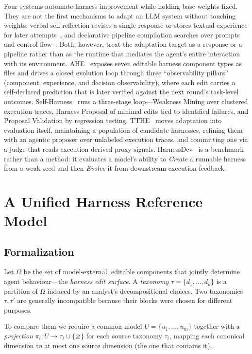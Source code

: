 \documentclass[conference]{IEEEtran}
\begin{document}
Four systems automate harness improvement while holding base weights fixed. They are not the first mechanisms to adapt an LLM system without touching weights: verbal self-reflection revises a single response or stores textual experience for later attempts~\cite{b16}, and declarative pipeline compilation searches over prompts and control flow~\cite{b17}. Both, however, treat the adaptation target as a response or a pipeline rather than as the runtime that mediates the agent's entire interaction with its environment. AHE~\cite{b3} exposes seven editable harness component types as files and drives a closed evolution loop through three ``observability pillars'' (component, experience, and decision observability), where each edit carries a self-declared prediction that is later verified against the next round's task-level outcomes. Self-Harness~\cite{b4} runs a three-stage loop---Weakness Mining over clustered execution traces, Harness Proposal of minimal edits tied to identified failures, and Proposal Validation by regression testing. TTHE~\cite{b5} moves adaptation into evaluation itself, maintaining a population of candidate harnesses, refining them with an agentic proposer over unlabeled execution traces, and committing one via a judge that reads execution-derived proxy signals. HarnessDev~\cite{b6} is a benchmark rather than a method: it evaluates a model's ability to \emph{Create} a runnable harness from a weak seed and then \emph{Evolve} it from downstream execution feedback.

\section{A Unified Harness Reference Model}
\label{sec:uhrm}

\subsection{Formalization}

Let $\Omega$ be the set of model-external, editable components that jointly determine agent behaviour---the \emph{harness edit surface}. A \emph{taxonomy} $\tau = \{d_1,\dots,d_k\}$ is a partition of $\Omega$ induced by an analyst's decompositional choices. Two taxonomies $\tau, \tau'$ are generally incompatible because their blocks were chosen for different purposes.

To compare them we require a common model $U=\{u_1,\dots,u_m\}$ together with a \emph{projection} $\pi_i : U \to \tau_i \cup \{\varnothing\}$ for each source taxonomy $\tau_i$, mapping each canonical dimension to at most one source dimension (the one that contains it).
\end{document}

